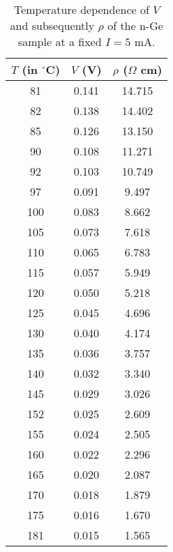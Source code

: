 \begin{table}[H]
    \centering
    \begin{tabular}{|c|c|c|}
    \hline
    $T$ (in $^\circ$C) & $V$ (V) & $\rho$ ($\Omega$ cm) \\ \hline
    81 & 0.141 & 14.715 \\
    82 & 0.138 & 14.402 \\
    85 & 0.126 & 13.150 \\
    90 & 0.108 & 11.271 \\
    92 & 0.103 & 10.749 \\
    97 & 0.091 & 9.497 \\
    100 & 0.083 & 8.662 \\
    105 & 0.073 & 7.618 \\
    110 & 0.065 & 6.783 \\
    115 & 0.057 & 5.949 \\
    120 & 0.050 & 5.218 \\
    125 & 0.045 & 4.696 \\
    130 & 0.040 & 4.174 \\
    135 & 0.036 & 3.757 \\
    140 & 0.032 & 3.340 \\
    145 & 0.029 & 3.026 \\
    152 & 0.025 & 2.609 \\
    155 & 0.024 & 2.505 \\
    160 & 0.022 & 2.296 \\
    165 & 0.020 & 2.087 \\
    170 & 0.018 & 1.879 \\
    175 & 0.016 & 1.670 \\
    181 & 0.015 & 1.565 \\\hline
    \end{tabular}
    \caption{Temperature dependence of $V$ and subsequently $\rho$ of the n-Ge sample at a fixed $I=5$ mA.}
\label{tab:3}
\end{table}